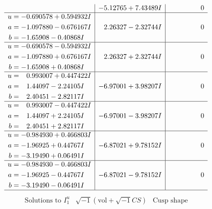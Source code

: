 \documentclass[1p]{elsarticle_modified}
\theoremstyle{definition}
\newcommand{\I}{\sqrt{-1}}
\begin{document}
$$\begin{array}{c|c|c}
 & -5.12765 + 7.43489 I & \phantom{-0.000000 } 0 \\ \hline\begin{aligned}
u &= -0.690578 + 0.594932 I \\
a &= -1.097880 - 0.676167 I \\
b &= -1.65908 - 0.40868 I\end{aligned}
 & \phantom{-}2.26327 - 2.32744 I & \phantom{-0.000000 } 0 \\ \hline\begin{aligned}
u &= -0.690578 - 0.594932 I \\
a &= -1.097880 + 0.676167 I \\
b &= -1.65908 + 0.40868 I\end{aligned}
 & \phantom{-}2.26327 + 2.32744 I & \phantom{-0.000000 } 0 \\ \hline\begin{aligned}
u &= \phantom{-}0.993007 + 0.447422 I \\
a &= \phantom{-}1.44097 - 2.24105 I \\
b &= \phantom{-}2.40451 - 2.82117 I\end{aligned}
 & -6.97001 + 3.98207 I & \phantom{-0.000000 } 0 \\ \hline\begin{aligned}
u &= \phantom{-}0.993007 - 0.447422 I \\
a &= \phantom{-}1.44097 + 2.24105 I \\
b &= \phantom{-}2.40451 + 2.82117 I\end{aligned}
 & -6.97001 - 3.98207 I & \phantom{-0.000000 } 0 \\ \hline\begin{aligned}
u &= -0.984930 + 0.466803 I \\
a &= -1.96925 + 0.44767 I \\
b &= -3.19490 + 0.06491 I\end{aligned}
 & -6.87021 + 9.78152 I & \phantom{-0.000000 } 0 \\ \hline\begin{aligned}
u &= -0.984930 - 0.466803 I \\
a &= -1.96925 - 0.44767 I \\
b &= -3.19490 - 0.06491 I\end{aligned}
 & -6.87021 - 9.78152 I & \phantom{-0.000000 } 0\\
 \hline 
 \end{array}$$\newpage$$\begin{array}{c|c|c}  
\text{Solutions to }I^u_{1}& \I (\text{vol} + \sqrt{-1}CS) & \text{Cusp shape}\\

\end{array}$$
\end{document}
